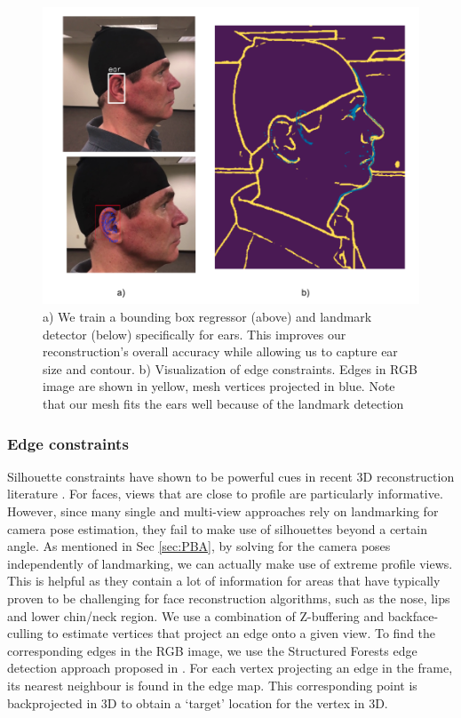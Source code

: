 \documentclass[10pt,twocolumn,letterpaper]{article}
\begin{document}
\begin{figure}[t]
\begin{center}
   \includegraphics[width=0.95\linewidth]{images/ear_lm_and_edges.png}
\end{center}
   \caption{ a) We train a bounding box regressor (above) and landmark detector (below) specifically for ears. This improves our reconstruction's overall accuracy while allowing us to capture ear size and contour. b) Visualization of edge constraints. Edges in RGB image are shown in yellow, mesh vertices projected in blue. Note that our mesh fits the ears well because of the landmark detection }
\label{fig:ear_lm_and_edges}
\end{figure}





\subsubsection{Edge constraints}
Silhouette constraints have shown to be powerful cues in recent 3D reconstruction literature \cite{alldieck2018detailed,bas2016fitting}. For faces, views that are close to profile are particularly informative. However, since many single and multi-view approaches rely on landmarking for camera pose estimation, they fail to make use of silhouettes beyond a certain angle.
As mentioned in Sec \ref{sec:PBA}, by solving for the camera poses independently of landmarking, we can actually make use of extreme profile views. This is helpful as they contain a lot of information for areas that have typically proven to be challenging for face reconstruction algorithms, such as the nose, lips and lower chin/neck region.
We use a combination of Z-buffering \cite{Foley1990ComputerG} and backface-culling  to estimate vertices that project an edge onto a given view. To find the corresponding edges in the RGB image, we use the Structured Forests edge detection approach proposed in \cite{dollar2013structured}. For each vertex projecting an edge in the frame, its nearest neighbour is found in the edge map. This corresponding point is backprojected in 3D to obtain a `target' location for the vertex in 3D.
\end{document}
